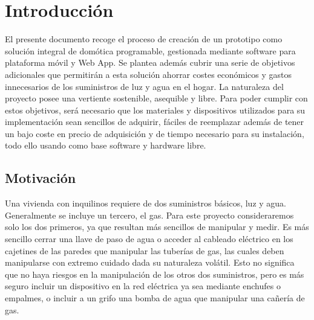 \cleardoublepage

\chapter{Introducción}

\label{makereference}
El presente documento recoge el proceso de creación de un prototipo como solución integral de domótica programable, gestionada mediante software para plataforma móvil y Web App. Se plantea además cubrir una serie de objetivos adicionales que permitirán a esta solución ahorrar costes económicos y gastos innecesarios de los suministros de luz y agua en el hogar. La naturaleza del proyecto posee una vertiente sostenible, asequible y libre. Para poder cumplir con estos objetivos, será necesario que los materiales y dispositivos utilizados para su implementación sean sencillos de adquirir, fáciles de reemplazar además de tener un bajo coste en precio de adquisición y de tiempo necesario para su instalación, todo ello usando como base software y hardware libre.

\section{Motivación}
\label{makereference1.1}

Una vivienda con inquilinos requiere de dos suministros básicos, luz y agua. Generalmente se incluye un tercero, el gas. Para este proyecto consideraremos solo los dos primeros, ya que resultan más sencillos de manipular y medir. Es más sencillo cerrar una llave de paso de agua o acceder al cableado eléctrico en los cajetines de las paredes que manipular las tuberías de gas, las cuales deben manipularse con extremo cuidado dada su naturaleza volátil. Esto no significa que no haya riesgos en la manipulación de los otros dos suministros, pero es más seguro incluir un dispositivo en la red eléctrica ya sea mediante enchufes o empalmes, o incluir a un grifo una bomba de agua que manipular una cañería de gas.

